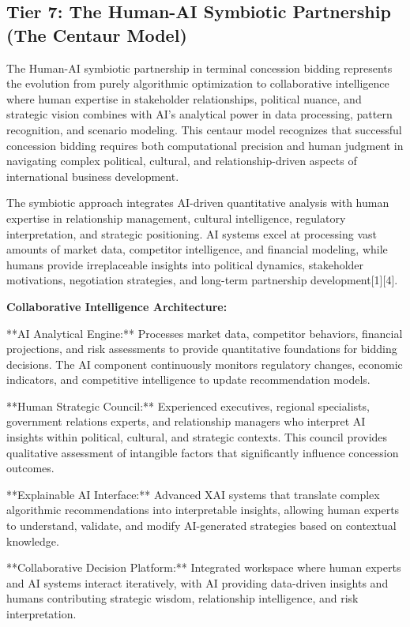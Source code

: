 \documentclass{article}
\begin{document}
\subsection{Tier 7: The Human-AI Symbiotic Partnership (The Centaur Model)}

The Human-AI symbiotic partnership in terminal concession bidding represents the evolution from purely algorithmic optimization to collaborative intelligence where human expertise in stakeholder relationships, political nuance, and strategic vision combines with AI's analytical power in data processing, pattern recognition, and scenario modeling. This centaur model recognizes that successful concession bidding requires both computational precision and human judgment in navigating complex political, cultural, and relationship-driven aspects of international business development.

The symbiotic approach integrates AI-driven quantitative analysis with human expertise in relationship management, cultural intelligence, regulatory interpretation, and strategic positioning. AI systems excel at processing vast amounts of market data, competitor intelligence, and financial modeling, while humans provide irreplaceable insights into political dynamics, stakeholder motivations, negotiation strategies, and long-term partnership development[1][4].

\textbf{Collaborative Intelligence Architecture:}

**AI Analytical Engine:** Processes market data, competitor behaviors, financial projections, and risk assessments to provide quantitative foundations for bidding decisions. The AI component continuously monitors regulatory changes, economic indicators, and competitive intelligence to update recommendation models.

**Human Strategic Council:** Experienced executives, regional specialists, government relations experts, and relationship managers who interpret AI insights within political, cultural, and strategic contexts. This council provides qualitative assessment of intangible factors that significantly influence concession outcomes.

**Explainable AI Interface:** Advanced XAI systems that translate complex algorithmic recommendations into interpretable insights, allowing human experts to understand, validate, and modify AI-generated strategies based on contextual knowledge.

**Collaborative Decision Platform:** Integrated workspace where human experts and AI systems interact iteratively, with AI providing data-driven insights and humans contributing strategic wisdom, relationship intelligence, and risk interpretation.
\end{document}
